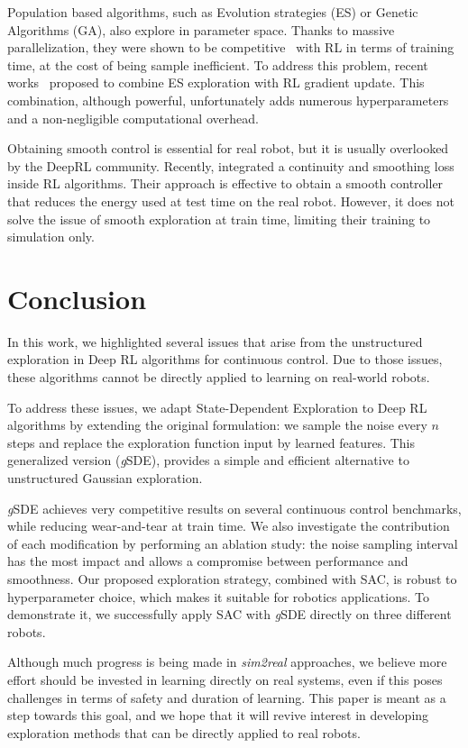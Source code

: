 \documentclass{article}
\newcommand{\sde}{State-Dependent Exploration\xspace}
\newcommand{\ourSDE}{\textit{g}\textsc{SDE}\xspace}
\newcommand{\sac}{\textsc{SAC}\xspace}
\begin{document}
Population based algorithms, such as Evolution strategies (ES) or Genetic Algorithms (GA), also explore in parameter space. Thanks to massive parallelization, they were shown to be competitive~\citep{such2017deep} with RL in terms of training time, at the cost of being sample inefficient. To address this problem,
recent works~\citep{pourchot2018cem} proposed to combine ES exploration with RL gradient update. This combination, although powerful, unfortunately adds numerous hyperparameters and a non-negligible computational overhead.

Obtaining smooth control is essential for real robot, but it is usually overlooked by the DeepRL community.
Recently, \citet{mysore2021caps} integrated a continuity and smoothing loss inside RL algorithms.
Their approach is effective to obtain a smooth controller that reduces the energy used at test time on the real robot.
However, it does not solve the issue of smooth exploration at train time, limiting their training to simulation only.

\section{Conclusion}

In this work, we highlighted several issues that arise from the unstructured exploration in Deep RL algorithms for continuous control. Due to those issues, these algorithms cannot be directly applied to learning on real-world robots.

To address these issues, we adapt \sde to Deep RL algorithms by extending the original formulation: we sample the noise every $n$ steps and replace the exploration function input by learned features.
This generalized version (\ourSDE), provides a simple and efficient alternative to unstructured Gaussian exploration.

\ourSDE achieves very competitive results on several continuous control benchmarks, while reducing wear-and-tear at train time.
We also investigate the contribution of each modification by performing an ablation study: the noise sampling interval has the most impact and allows a compromise between performance and smoothness.
Our proposed exploration strategy, combined with \sac, is robust to hyperparameter choice, which makes it suitable for robotics applications.
To demonstrate it, we successfully apply \sac with \ourSDE directly on three different robots.

Although much progress is being made in \textit{sim2real} approaches, we believe
more effort should be invested in learning directly on real systems, even if this poses challenges in terms of safety and duration of learning.
This paper is meant as a step towards this goal, and we hope that it will revive interest in developing exploration methods that can be directly applied to real robots.
\end{document}
